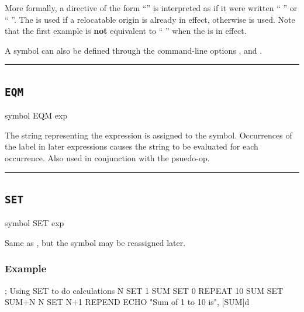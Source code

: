 More formally, a directive of the form ``'' is
interpreted as if it were written `` '' or  `` ''.
The  is used if a relocatable origin is already in effect,
otherwise  is used. Note that the first example is \textbf{not}
equivalent to `` '' when the  is in effect.

A symbol can also be defined through the command-line options ,  and .\\

\hrule
\subsection{\texttt{EQM}}
\label{pseudoop:eqm}

\begin{usage}
symbol EQM exp
\end{usage}

The string representing the expression is assigned to the
symbol.  Occurrences of the label in later expressions causes
the string to be evaluated for each occurrence.  Also used in
conjunction with the  psuedo-op.\\

\hrule
\subsection{\texttt{SET}}
\label{pseudoop:set}

\begin{usage}
symbol SET exp
\end{usage}


Same as , but the symbol may be reassigned later.\\

\subsubsection{Example}

\begin{code}
; Using SET to do calculations
N SET 1 
SUM SET 0
  REPEAT 10
SUM SET SUM+N
N SET N+1
  REPEND
  ECHO "Sum of 1 to 10 is", [SUM]d
\end{code}

